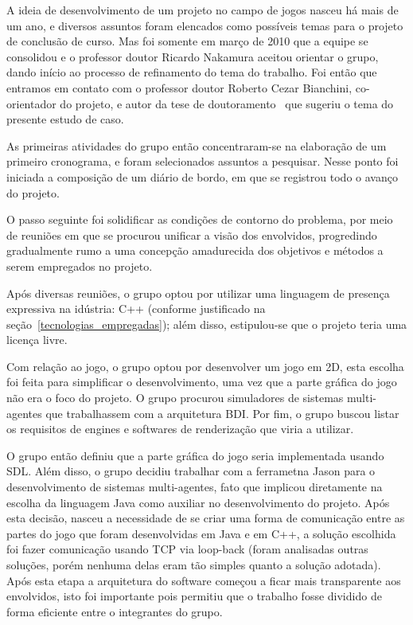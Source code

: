 A ideia de desenvolvimento de um projeto no campo de jogos nasceu há mais de um ano, e diversos assuntos foram elencados como possíveis temas para o projeto de conclusão de curso. Mas foi somente em março de 2010 que a equipe se consolidou e o professor doutor Ricardo Nakamura aceitou orientar o grupo, dando início ao processo de refinamento do tema do trabalho. Foi então que entramos em contato com o professor doutor Roberto Cezar Bianchini, co-orientador do projeto, e autor da tese de doutoramento~\cite{tese_roberto} que sugeriu o tema do presente estudo de caso.  

As primeiras atividades do grupo então concentraram-se na elaboração de um primeiro cronograma, e foram selecionados assuntos a pesquisar. Nesse ponto foi iniciada a composição de um diário de bordo, em que se registrou todo o avanço do projeto.

O passo seguinte foi solidificar as condições de contorno do problema, por meio de reuniões em que se procurou unificar a visão dos envolvidos, progredindo gradualmente rumo a uma concepção amadurecida dos objetivos e métodos a serem empregados no projeto.

Após diversas reuniões, o grupo optou por utilizar uma linguagem de presença expressiva na idústria: C++ (conforme justificado na seção~\ref{tecnologias_empregadas}); além disso, estipulou-se que o projeto teria uma licença livre.

Com relação ao jogo, o grupo optou por desenvolver um jogo em 2D, esta escolha foi feita para simplificar o desenvolvimento, uma vez que a parte gráfica do jogo não era o foco do projeto.
O grupo procurou simuladores de sistemas multi-agentes que trabalhassem com a arquitetura BDI. Por fim, o grupo buscou listar os requisitos de engines e softwares de renderização que viria a utilizar.

O grupo então definiu que a parte gráfica do jogo seria implementada usando SDL. Além disso, o grupo decidiu trabalhar com a ferrametna Jason para o desenvolvimento de sistemas multi-agentes, fato que implicou diretamente na escolha da linguagem Java como auxiliar no desenvolvimento do projeto.
Após esta decisão, nasceu a necessidade de se criar uma forma de comunicação entre as partes do jogo que foram desenvolvidas em Java e em C++, a solução escolhida foi fazer comunicação usando TCP via loop-back (foram analisadas outras soluções, porém nenhuma delas eram tão simples quanto a solução adotada). Após esta etapa a arquitetura do software começou a ficar mais transparente aos envolvidos, isto foi importante pois permitiu que o trabalho fosse dividido de forma eficiente entre o integrantes do grupo.


